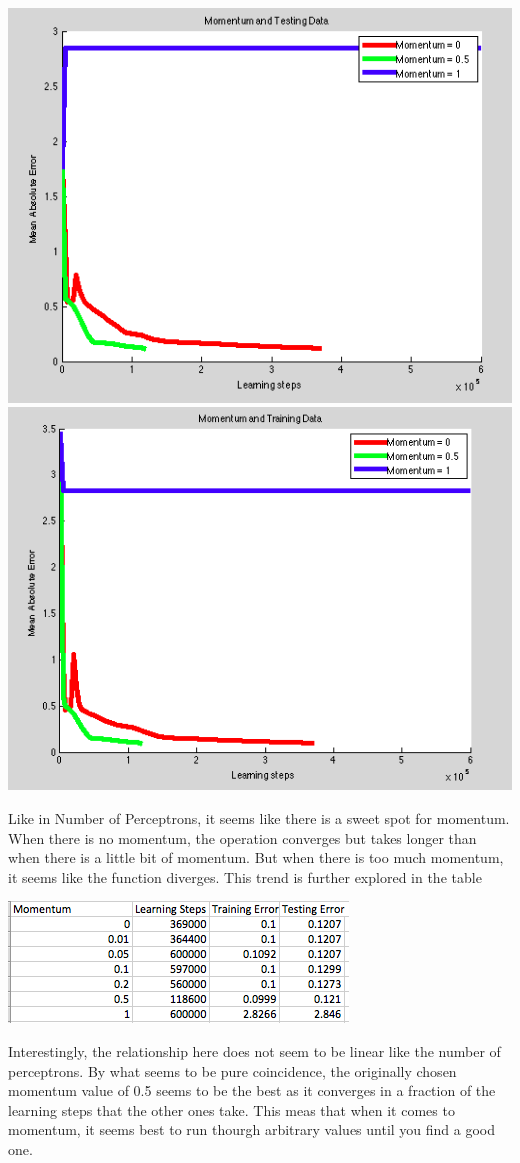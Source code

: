 \documentclass[epsfig]{article}
\begin{document}
 \begin{center}
 \includegraphics[scale=0.45]{pic7}
 \includegraphics[scale=0.45]{pic7a}
 \end{center}
 Like in Number of Perceptrons, it seems like there is a sweet spot for momentum. When there is no momentum, the operation converges but takes longer than when there is a little bit of momentum. But when there is too much momentum, it seems like the function diverges. This trend is further explored in the table
 \begin{center}
 \includegraphics[scale=0.7]{pic8}
 \end{center}
 Interestingly, the relationship here does not seem to be linear like the number of perceptrons. By what seems to be pure coincidence, the originally chosen momentum value of 0.5 seems to be the best as it converges in a fraction of the learning steps that the other ones take. This meas that when it comes to momentum, it seems best to run thourgh arbitrary values until you find a good one.
 \newpage
\end{document}
